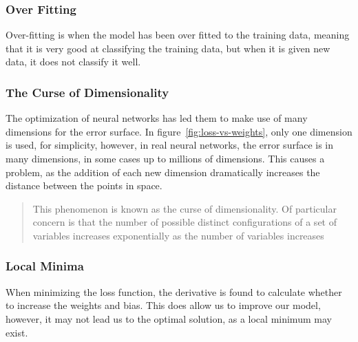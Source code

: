 \documentclass[titlepage]{article}
\begin{document}
\subsubsection{Over Fitting}
Over-fitting is when the model has been over fitted to the training data, meaning that it is very good at classifying the training data, but when it is given new data, it does not classify it well.

\subsubsection{The Curse of Dimensionality}
The optimization of neural networks has led them to make use of many dimensions for the error surface. In figure~\ref{fig:loss-vs-weights}, only one dimension is used, for simplicity, however, in real neural networks, the error surface is in many dimensions, in some cases up to millions of dimensions. This causes a problem, as the addition of each new dimension dramatically increases the distance between the points in space.\cite{curse-of-dimensionality}
\begin{quotation}
    This phenomenon is known as the curse of dimensionality. Of particular concern is that the number of possible distinct configurations of a set of variables increases exponentially as the number of variables increases
\end{quotation}

\subsubsection{Local Minima}
When minimizing the loss function, the derivative is found to calculate whether to increase the weights and bias. This does allow us to improve our model, however, it may not lead us to the optimal solution, as a local minimum may exist.
\end{document}
